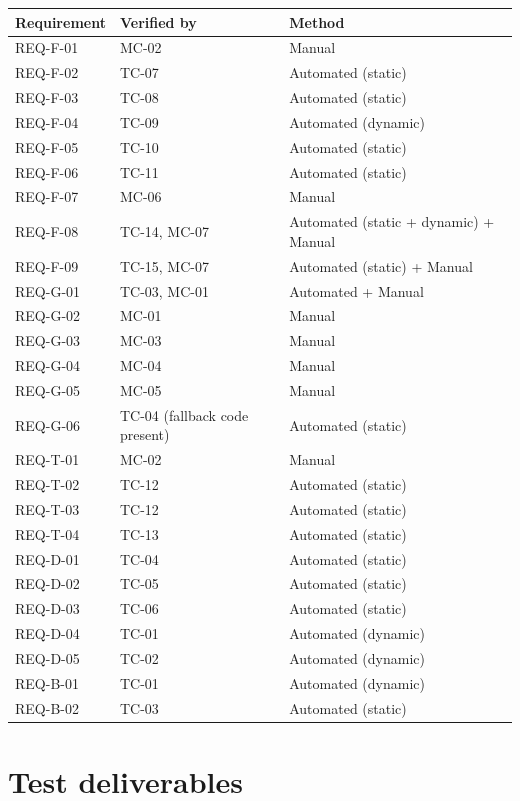 \documentclass[12pt]{article}
\begin{document}
\begin{longtable}{p{}p{}p{}}
\toprule
\textbf{Requirement} & \textbf{Verified by} & \textbf{Method} \\
\midrule
REQ-F-01 & MC-02 & Manual \\
REQ-F-02 & TC-07 & Automated (static) \\
REQ-F-03 & TC-08 & Automated (static) \\
REQ-F-04 & TC-09 & Automated (dynamic) \\
REQ-F-05 & TC-10 & Automated (static) \\
REQ-F-06 & TC-11 & Automated (static) \\
REQ-F-07 & MC-06 & Manual \\
REQ-F-08 & TC-14, MC-07 & Automated (static + dynamic) + Manual \\
REQ-F-09 & TC-15, MC-07 & Automated (static) + Manual \\
REQ-G-01 & TC-03, MC-01 & Automated + Manual \\
REQ-G-02 & MC-01 & Manual \\
REQ-G-03 & MC-03 & Manual \\
REQ-G-04 & MC-04 & Manual \\
REQ-G-05 & MC-05 & Manual \\
REQ-G-06 & TC-04 (fallback code present) & Automated (static) \\
REQ-T-01 & MC-02 & Manual \\
REQ-T-02 & TC-12 & Automated (static) \\
REQ-T-03 & TC-12 & Automated (static) \\
REQ-T-04 & TC-13 & Automated (static) \\
REQ-D-01 & TC-04 & Automated (static) \\
REQ-D-02 & TC-05 & Automated (static) \\
REQ-D-03 & TC-06 & Automated (static) \\
REQ-D-04 & TC-01 & Automated (dynamic) \\
REQ-D-05 & TC-02 & Automated (dynamic) \\
REQ-B-01 & TC-01 & Automated (dynamic) \\
REQ-B-02 & TC-03 & Automated (static) \\
\bottomrule
\end{longtable}

\section{Test deliverables}
\end{document}
